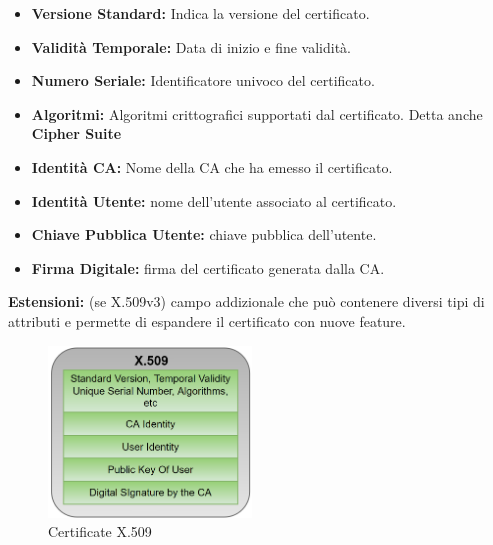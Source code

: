 \begin{example}
\begin{itemize}
    \item \textbf{Versione Standard:} Indica la versione del certificato.
    \item \textbf{Validità Temporale:} Data di inizio e fine validità.
    \item \textbf{Numero Seriale:} Identificatore univoco del certificato.
    \item \textbf{Algoritmi:} Algoritmi crittografici supportati dal certificato. Detta anche \textbf{Cipher Suite}
    \item \textbf{Identità CA:} Nome della CA che ha emesso il certificato.
    \item \textbf{Identità Utente:} nome dell'utente associato al certificato.
    \item \textbf{Chiave Pubblica Utente:} chiave pubblica dell'utente.
    \item \textbf{Firma Digitale:} firma del certificato generata dalla CA.
\end{itemize}
\begin{remark}[X.509v3 Extension]
\textbf{Estensioni:} (se X.509v3) campo addizionale che può contenere diversi tipi di attributi e permette di espandere il certificato con nuove feature.
\end{remark}
\end{example}
\begin{figure}[h]
    \centering
    \includegraphics[width=0.48\textwidth]{image/x509.png}
    \caption{Certificate X.509}
    \label{fig:certx509}
    \vspace{-7pt}
\end{figure}
